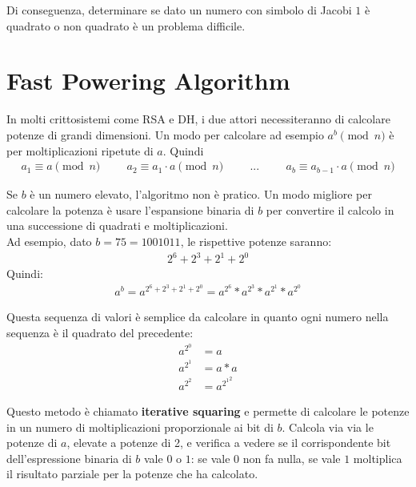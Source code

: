 \noindent Di conseguenza, determinare se dato un numero con simbolo di Jacobi $1$ è quadrato o non quadrato è un problema difficile.

\section{Fast Powering Algorithm}
In molti crittosistemi come RSA e DH, i due attori necessiteranno di calcolare potenze di grandi dimensioni. Un modo per calcolare ad esempio $a^b \pmod n$ è per moltiplicazioni ripetute di $a$. Quindi
\begin{align*}
    a_1 \equiv a \pmod n \hspace{1cm} a_2 \equiv a_1 \cdot a \pmod n \hspace{1cm} ... \hspace{1cm} a_{b} \equiv a_{b-1} \cdot a \pmod n
\end{align*}

\noindent Se $b$ è un numero elevato, l'algoritmo non è pratico. Un modo migliore per calcolare la potenza è usare l'espansione binaria di $b$ per convertire il calcolo in una successione di quadrati e moltiplicazioni.\\
 
\noindent Ad esempio, dato $b = 75 = 1001011$, le rispettive potenze saranno:
 \begin{align*}
     2^6+2^3+2^1+2^0 
 \end{align*}
 \noindent Quindi:
 \begin{align*}
     a^b = a^{2^6+2^3+2^1+2^0} = a^{2^6} *a^{2^3}*a^{2^1}*a^{2^0}
 \end{align*}

\noindent Questa sequenza di valori è semplice da calcolare in quanto ogni numero nella sequenza è il quadrato del precedente:
\begin{align*}
    a^{2^0} &= a\\
    a^{2^1} &= a*a\\
    a^{2^2} &= a^{{2^1}^2}
\end{align*}

\noindent Questo metodo è chiamato \textbf{iterative squaring} e permette di calcolare le potenze in un numero di moltiplicazioni proporzionale ai bit di $b$. Calcola via via le potenze di $a$, elevate a potenze di 2, e verifica a vedere se il corrispondente bit dell'espressione binaria di $b$ vale $0$ o $1$: se vale $0$ non fa nulla, se vale $1$ moltiplica il risultato parziale per la potenze che ha calcolato.

